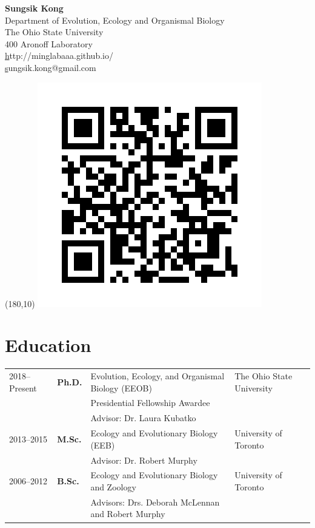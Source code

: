 \documentclass[11pt]{article}
\begin{document}
\pagestyle{plain}

\begin{center}
\huge \textbf{Sungsik Kong}\\
\vspace{0.2cm}
\large Department of Evolution, Ecology and Organismal Biology\\
\large The Ohio State University\\
\large 400 Aronoff Laboratory\\
\small \href{http://minglabaaa.github.io}http://minglabaaa.github.io/\\
\small \href{mailto:sungsik.kong@gmail.com}sungsik.kong@gmail.com
\end{center}

\begin{textblock}{20}(180,10)
	\includegraphics[scale=0.2]{miglabaaa.png}
\end{textblock}


\hspace{0pt}




\section*{Education}

\begin{longtable}{p{}  p{} p{} p{}}
2018--Present & \textbf{Ph.D.} & Evolution, Ecology, and Organismal Biology (EEOB) & The Ohio State University\\
 & & Presidential Fellowship Awardee\\
 & & Advisor: Dr. Laura Kubatko\\
2013--2015 & \textbf{M.Sc.} & Ecology and Evolutionary Biology (EEB) & University of Toronto\\
 & & Advisor: Dr. Robert Murphy\\
2006--2012 & \textbf{B.Sc.} & Ecology and Evolutionary Biology and Zoology & University of Toronto\\
 & & Advisors: Drs. Deborah McLennan and Robert Murphy
\end{longtable}
\end{document}

